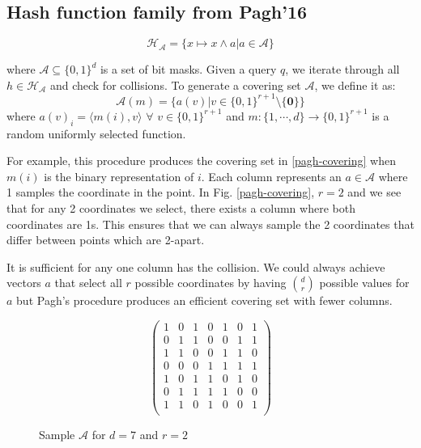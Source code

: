 \documentclass{scrartcl}
\begin{document}
\subsection{Hash function family from Pagh'16}
\begin{equation*}
    \mathcal{H}_{\mathcal{A}} = \{x \mapsto x \wedge a | a \in \mathcal{A}\}
\end{equation*}

where $\mathcal{A} \subseteq \{0,1\}^d$ is a set of bit masks. 
Given a query $q$, we iterate through all $h \in \mathcal{H}_{\mathcal{A}}$ and check for collisions. To generate a covering set $\mathcal{A}$, we define it as:
\begin{equation*}
    \mathcal{A}(m) = \{a(v) | v \in \{0,1\}^{r+1} \setminus \{\mathbf{0}\}\}
\end{equation*}
where $a(v)_i = \langle m(i),v \rangle$ $\forall$ $v \in \{0,1\}^{r+1}$ and $m : \{1,\cdots,d\} \rightarrow \{0,1\}^{r+1}$ is a random uniformly selected function.

For example, this procedure produces the covering set in \ref{pagh-covering} when $m(i)$ is the binary representation of $i$. Each column represents an $a \in \mathcal{A}$ where 1 samples the coordinate in the point. In Fig. \ref{pagh-covering}, $r=2$ and we see that for any 2 coordinates we select, there exists a column where both coordinates are 1s. This ensures that we can always sample the 2 coordinates that differ between points which are 2-apart.

It is sufficient for any one column has the collision. We could always achieve vectors $a$ that select all $r$ possible coordinates by having ${d \choose r}$ possible values for $a$ but Pagh's procedure produces an efficient covering set with fewer columns.

\begin{figure}
  \centering
        \[ \left( \begin{array}{ccccccc}
        1 & 0 & 1 & 0 & 1 & 0 & 1 \\
        0 & 1 & 1 & 0 & 0 & 1 & 1 \\
        1 & 1 & 0 & 0 & 1 & 1 & 0 \\
        0 & 0 & 0 & 1 & 1 & 1 & 1 \\
        1 & 0 & 1 & 1 & 0 & 1 & 0 \\
        0 & 1 & 1 & 1 & 1 & 0 & 0 \\
        1 & 1 & 0 & 1 & 0 & 0 & 1 \\
        \end{array} \right)\]
        \caption{Sample $\mathcal{A}$ for $d = 7$ and $r=2$}
        \label{pagh-covering}
  \label{fig:gull}
\end{figure}
\end{document}
